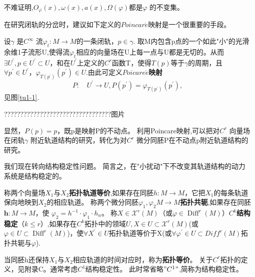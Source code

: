 不难证明,$O _ { \varphi } ( x ) , \omega ( x ) , a ( x ) , \Omega ( \varphi )$都是\(\varphi\) 的不变集。


在研究闭轨的分岔时，建议如下定义的$Poincar\acute{e}$映射是一个很重要的手段。

\begin{defination}
  设\(\gamma\) 是\(C^\infty\) 流$\varphi _t:M \rightarrow M$的一条闭轨，\(p \in \gamma\).
  取M内包含p点的一个如此"小"的光滑余维1子流形U,使得流\(\varphi_t\)相应的向量场在U上每一点与U都是无切的。从而$\exists U ^ { \prime } , p \in U ^ { \prime } \subset U$，和在\(U^{\prime}\)上定义的\(C^r\)函数T，使得\(T(p)\)等于\(\gamma\)的周期，且$\forall p ^ { \prime } \in U ^ { \prime }，\varphi _ { T \left( p ^ { \prime } \right) } \left( p ^ { \prime } \right) \in U.$由此可定义\textbf{$Poicare\acute{e}$映射}
  \[P : \quad U^{\prime} \rightarrow U,P \left( p ^ { \prime } \right) = \varphi_{T(p^\prime)}(p^\prime),\]
见图\ref{tu1-1}.
\end{defination}
?????????????????????????????????图片

显然，$P ( p ) = p$，既p是映射P的不动点。
利用Poincare映射,可以把对\(C^r\) 向量场在闭轨\(\gamma\) 附近轨道结构的研究，转化为对\(C^r\) 微分同胚P在不动点p附近轨道结构的研究。


我们现在转向结构稳定性问题。
简言之，在"小扰动"下不改变其轨道结构的动力系统是结构稳定的。


\begin{defination}
  称两个向量场\(X_1\)与\(X_2\)\textbf{拓扑轨道等价},如果存在同胚$h: M \rightarrow M$，它把\(X_1\)的每条轨道保向地映到\(X_2\)的相应轨道。
  称两个微分同胚$ \varphi _ { 1 } , \varphi _ { 2} M \rightarrow M$\textbf{拓扑共轭},如果存在同胚$\boldsymbol { h } : M \rightarrow M$，使
  $\varphi _ { 2 } = h ^ { - 1 } \cdot \varphi_ { 1 } \cdot h _ { n }$。
  称$X \in \mathscr { X } ^ { r } ( M )$（或$\varphi \in \operatorname { Diff } ^ { r } ( M ) $）\textbf{\(C^k\)结构稳定}（$k \leqslant r$）,如果存在\(C^k\)拓扑中的领域$ U ,X \in U \subset \mathscr { X } ^ { r } ( M )$(或$\varphi \in U \subset \operatorname { Diff } ^ { r } ( M )$)，使$\forall X ^ { \prime } \in U$拓扑轨道等价于X(或\(\forall \varphi^{\prime} \in U \subset D i f f ^ { r } ( M )\)拓扑共轭与\(\varphi\)).
  \label{gui}
\end{defination}



当同胚h还保持\(X_1\)与\(X_2\)相应轨道的时间对应时，称为\textbf{拓扑等价}。
关于\(C^r\)拓扑的定义，见附录C。通常考虑\(C^1\)结构稳定性。
此时常省略\("C^1"\),简称为结构稳定性。


